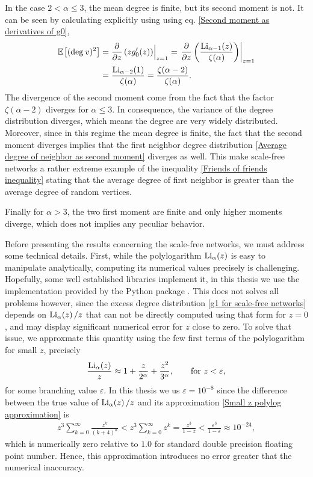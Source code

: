 \documentclass[
11pt, %
english, %
singlespacing, %
nolistspacing, %
liststotoc, %
headsepline, %
]{MastersDoctoralThesis} %
\begin{document}
In the case $2 < \alpha \leq 3$, the mean degree is finite, but its second moment is not. It can be seen by calculating explicitly using using eq. \eqref{Second moment as derivatives of g0},
\begin{align}
	\mathbb{E}_{}\!\left[ (\mathrm{deg}_{}\, v)^2 \right] &= \frac{\partial}{\partial z}\left(z g'_0(z)\right)\Bigr|_{z = 1} = \left. \frac{\partial}{\partial z}\left(\frac{\mathrm{Li}_{\alpha - 1}\!\left(z\right)}{\zeta(\alpha)} \right)\right\rvert_{z = 1} \\
		&= \frac{\mathrm{Li}_{\alpha - 2}\!\left(1\right)}{\zeta(\alpha)} = \frac{\zeta(\alpha - 2)}{\zeta(\alpha)}.
\end{align} 
The divergence of the second moment come from the fact that the factor $\zeta(\alpha - 2)$ diverges for $\alpha \leq 3$. In consequence, the variance of the degree distribution diverges, which means the degree are very widely distributed. Moreover, since in this regime the mean degree is finite, the fact that the second moment diverges implies that the first neighbor degree distribution \eqref{Average degree of neighbor as second moment} diverges as well. This make scale-free networks a rather extreme example of the inequality \eqref{Friends of friends inequality} stating that the average degree of first neighbor is greater than the average degree of random vertices.

Finally for $\alpha > 3$, the two first moment are finite and only higher moments diverge, which does not implies any peculiar behavior.

Before presenting the results concerning the scale-free networks, we must address some technical details. First, while the polylogarithm $\mathrm{Li}_{\alpha}\!\left(z\right)$ is easy to manipulate analytically, computing its numerical values precisely is challenging. Hopefully, some well established libraries implement it, in this thesis we use the implementation provided by the  Python package \cite{mpmath}. This does not solves all problems however, since the excess degree distribution \eqref{g1 for scale-free networks} depends on $\mathrm{Li}_{\alpha}\!\left(z\right)/z$ that can not be directly computed using that form for $z = 0$, and may display significant numerical error for $z$ close to zero. To solve that issue, we approxmate this quantity using the few first terms of the polylogarithm for small $z$, precisely
\begin{align}
	\frac{\mathrm{Li}_{\alpha}\!\left(z\right)}{z} \approx 1 + \frac{z}{2^\alpha} + \frac{z^2}{3^\alpha}, \qquad \text{for } z < \varepsilon, \label{Small z polylog approximation}
\end{align}
for some branching value $\varepsilon$. In this thesis we us $\varepsilon = 10^{-8}$ since the difference between the true value of $\mathrm{Li}_{\alpha}\!\left(z\right)/z$ and its approximation \eqref{Small z polylog approximation} is
\begin{align}
	z^3 \sum_{k=0}^\infty \frac{z^k}{(k + 4)^\alpha} < z^3 \sum_{k=0}^\infty z^k = \frac{z^3}{1 - z} < \frac{\varepsilon^3}{1 - \varepsilon} \approx 10^{-24},
\end{align}
which is numerically zero relative to $1.0$ for standard double precision floating point number. Hence, this approximation introduces no error greater that the numerical inaccuracy.
\end{document}
